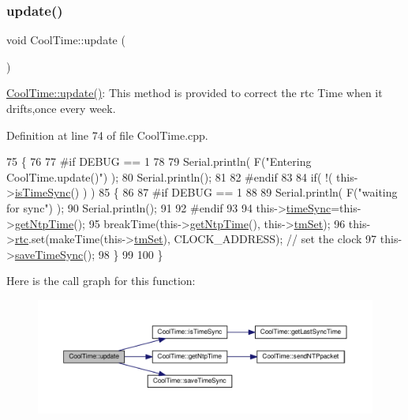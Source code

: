 \subsubsection{\texorpdfstring{update()}{update()}}
{\footnotesize\ttfamily void Cool\+Time\+::update (\begin{DoxyParamCaption}{ }\end{DoxyParamCaption})}

\hyperlink{class_cool_time_aae601f795452cfa48d9fb337aed483a8}{Cool\+Time\+::update()}\+: This method is provided to correct the rtc Time when it drifts,once every week. 

Definition at line 74 of file Cool\+Time.\+cpp.


\begin{DoxyCode}
75 \{
76 
77 \textcolor{preprocessor}{#if DEBUG == 1}
78 
79     Serial.println( F(\textcolor{stringliteral}{"Entering CoolTime.update()"}) );
80     Serial.println();
81 
82 \textcolor{preprocessor}{#endif }
83 
84     \textcolor{keywordflow}{if}( !( this->\hyperlink{class_cool_time_a5ae038a4498602b189f76a10bf02adf8}{isTimeSync}() ) )
85     \{
86     
87 \textcolor{preprocessor}{    #if DEBUG == 1}
88 
89         Serial.println( F(\textcolor{stringliteral}{"waiting for sync"}) );
90         Serial.println();
91 
92 \textcolor{preprocessor}{    #endif }
93 
94         this->\hyperlink{class_cool_time_a9d032e76c3470a15b3bbbc52af6463f7}{timeSync}=this->\hyperlink{class_cool_time_a41fbbbfd651c2079f54d4b2911e4c705}{getNtpTime}();
95         breakTime(this->\hyperlink{class_cool_time_a41fbbbfd651c2079f54d4b2911e4c705}{getNtpTime}(), this->\hyperlink{class_cool_time_ad33c2713c903ff064ad09c46406ae088}{tmSet});
96         this->\hyperlink{class_cool_time_abd38f2384ff90692b1568d9db869412e}{rtc}.set(makeTime(this->\hyperlink{class_cool_time_ad33c2713c903ff064ad09c46406ae088}{tmSet}), CLOCK\_ADDRESS); \textcolor{comment}{// set the clock}
97         this->\hyperlink{class_cool_time_ae9658c9b377510d469e3b88edf33ee85}{saveTimeSync}();
98     \}
99     
100 \}
\end{DoxyCode}
Here is the call graph for this function\+:\nopagebreak
\begin{figure}[H]
\begin{center}
\leavevmode
\includegraphics[width=350pt]{d6/d49/class_cool_time_aae601f795452cfa48d9fb337aed483a8_cgraph}
\end{center}
\end{figure}
